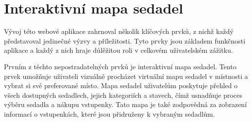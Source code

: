 \section{Interaktivní mapa sedadel}
\label{sec:implementace-seating}
Vývoj této webové aplikace zahrnoval několik klíčových prvků, z nichž každý představoval jedinečné výzvy a příležitosti.
Tyto prvky jsou základem funkčnosti aplikace a každý z nich hraje důlěžitou roli v celkovém uživatelském zážitku.

Prvním z těchto nepostradatelných prvků je interaktivní mapa sedadel.
Tento prvek umožňuje uživateli vizuálně procházet virtuální mapu sedadel v místnosti a vybrat si své preferované místo.
Mapa sedadel uživatelům poskytuje přehled o všech dostupných sedadlech, jejich kategoriích a stavech, čímž usnadňuje proces výběru sedadla a nákupu vstupenky.
Tato mapa je také zodpovědná za zobrazení informací o vstupenkách, které jsou přidruženy k vybraným sedadlům.

